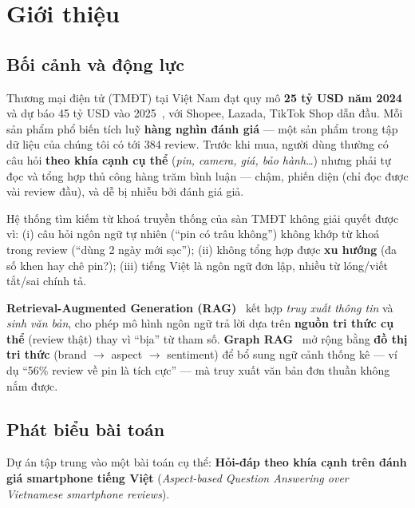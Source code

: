 \documentclass[12pt,a4paper]{article}
\begin{document}
\section{Giới thiệu}

\subsection{Bối cảnh và động lực}

Thương mại điện tử (TMĐT) tại Việt Nam đạt quy mô \textbf{25 tỷ USD năm 2024} và dự báo 45 tỷ USD vào 2025~\cite{google_ecns2024}, với Shopee, Lazada, TikTok Shop dẫn đầu. Mỗi sản phẩm phổ biến tích luỹ \textbf{hàng nghìn đánh giá} --- một sản phẩm trong tập dữ liệu của chúng tôi có tới 384 review. Trước khi mua, người dùng thường có câu hỏi \textbf{theo khía cạnh cụ thể} (\textit{pin, camera, giá, bảo hành}\ldots) nhưng phải tự đọc và tổng hợp thủ công hàng trăm bình luận --- chậm, phiến diện (chỉ đọc được vài review đầu), và dễ bị nhiễu bởi đánh giá giả.

Hệ thống tìm kiếm từ khoá truyền thống của sàn TMĐT không giải quyết được vì: (i) câu hỏi ngôn ngữ tự nhiên (``pin có trâu không'') không khớp từ khoá trong review (``dùng 2 ngày mới sạc''); (ii) không tổng hợp được \textbf{xu hướng} (đa số khen hay chê pin?); (iii) tiếng Việt là ngôn ngữ đơn lập, nhiều từ lóng/viết tắt/sai chính tả.

\textbf{Retrieval-Augmented Generation (RAG)}~\cite{lewis2020rag} kết hợp \textit{truy xuất thông tin} và \textit{sinh văn bản}, cho phép mô hình ngôn ngữ trả lời dựa trên \textbf{nguồn tri thức cụ thể} (review thật) thay vì ``bịa'' từ tham số. \textbf{Graph RAG}~\cite{edge2024graphrag} mở rộng bằng \textbf{đồ thị tri thức} (brand $\to$ aspect $\to$ sentiment) để bổ sung ngữ cảnh thống kê --- ví dụ ``56\% review về pin là tích cực'' --- mà truy xuất văn bản đơn thuần không nắm được.

\subsection{Phát biểu bài toán}
\label{sec:problem}

Dự án tập trung vào một bài toán cụ thể: \textbf{Hỏi-đáp theo khía cạnh trên đánh giá smartphone tiếng Việt} (\textit{Aspect-based Question Answering over Vietnamese smartphone reviews}).
\end{document}

